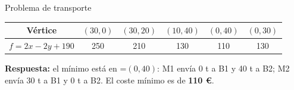 \documentclass[11pt,a4paper]{article}
\newcommand{\fmm}[1]{\setbox0=\hbox{$#1$}\ifdim\wd0>\linewidth\fmdisp{#1}\else\mbox{\box0}\fi}
\newcommand{\fmdisp}[1]{\[\setbox2=\hbox{$\displaystyle #1$}\ifdim\wd2>\linewidth\resizebox{\linewidth}{!}{\box2}\else\box2\fi\]}
\begin{document}
\begin{fmex}{Problema de transporte}
\begin{center}\renewcommand{\arraystretch}{1.5}\begin{tabular}{cccccc}\toprule
\textbf{Vértice} & \textbf{$(30,0)$} & \textbf{$(30,20)$} & \textbf{$(10,40)$} & \textbf{$(0,40)$} & \textbf{$(0,30)$}\\\midrule
\textbf{$f=2x-2y+190$} & 250 & 210 & 130 & \cellcolor{fmyellow!45}110 & 130\\
\bottomrule\end{tabular}\end{center}

\textbf{Respuesta:} el mínimo está en \fmm{(0,40)}: M1 envía 0 t a B1 y 40 t a B2; M2 envía 30 t a B1 y 0 t a B2. El coste mínimo es de \textbf{110 €}.
\end{fmex}

\end{document}
